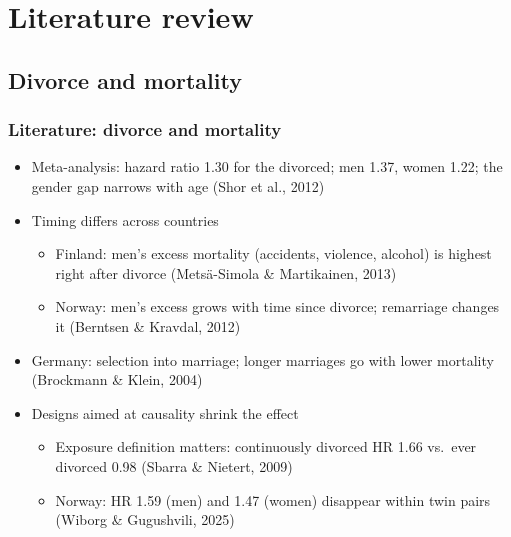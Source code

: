 \documentclass[t,20pt]{beamer}
\newcommand{\ct}[1]{{\color{BiBBlau80}(#1)}}                        %
\begin{document}
\section{Literature review}

\subsection{Divorce and mortality}
\begin{bibframe}
  \frametitle{Literature: divorce and mortality}
  \begin{itemize}
    \item Meta-analysis: hazard ratio 1.30 for the divorced; men 1.37, women 1.22; the gender gap narrows with age \ct{Shor et al., 2012}
    \item Timing differs across countries
    \begin{itemize}
      \item Finland: men's excess mortality (accidents, violence, alcohol) is highest right after divorce \ct{Metsä-Simola \& Martikainen, 2013}
      \item Norway: men's excess grows with time since divorce; remarriage changes it \ct{Berntsen \& Kravdal, 2012}
    \end{itemize}
    \item Germany: selection into marriage; longer marriages go with lower mortality \ct{Brockmann \& Klein, 2004}
    \item Designs aimed at causality shrink the effect
    \begin{itemize}
      \item Exposure definition matters: continuously divorced HR 1.66 vs.\ ever divorced 0.98 \ct{Sbarra \& Nietert, 2009}
      \item Norway: HR 1.59 (men) and 1.47 (women) disappear within twin pairs \ct{Wiborg \& Gugushvili, 2025}
    \end{itemize}
  \end{itemize}
\end{bibframe}
\end{document}
